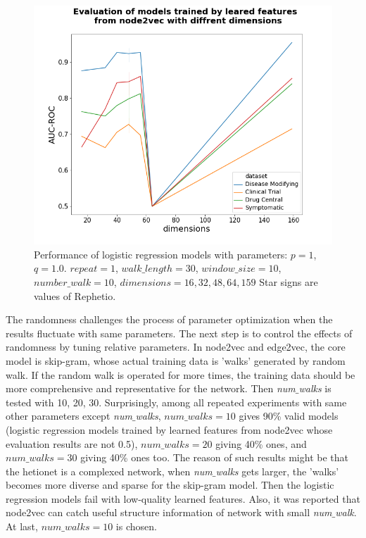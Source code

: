 \begin{figure}[!h]
    \centering
    \includegraphics[scale=0.55]
    {figures/dimensions.png}
    \captionsetup{justification=centering}
    \caption[Evaluation of different dimensions in node2vec]{\label{fig:dimensions}Performance of logistic regression models with parameters: $p = 1$, $q = 1.0$. $repeat = 1$, $walk\_length = 30$, $window\_size = 10$, $number\_walk = 10$, $dimensions = 16, 32, 48, 64, 159$ Star signs are values of Rephetio.
}
\end{figure}

The randomness challenges the process of parameter optimization when the results fluctuate with same parameters. The next step is to control the effects of randomness by tuning relative parameters. In node2vec and edge2vec, the core model is skip-gram, whose actual training data is 'walks' generated by random walk. If the random walk is operated for more times, the training data should be more comprehensive and representative for the network. Then \textit{num$\_$walks} is tested with 10, 20, 30. Surprisingly, among all repeated experiments with same other parameters except \textit{num$\_$walks}, $num\_walks = 10$ gives 90\% valid models (logistic regression models trained by learned features from node2vec whose evaluation results are not 0.5), $num\_walks = 20$ giving 40\% ones, and $num\_walks = 30$ giving 40\% ones too. The reason of such results might be that the hetionet is a complexed network, when \textit{num$\_$walks} gets larger, the 'walks' becomes more diverse and sparse for the skip-gram model. Then the logistic regression models fail with low-quality learned features. Also, it was reported that node2vec can catch useful structure information of network with small \textit{num$\_$walk}. At last, $num\_walks = 10$ is chosen.

